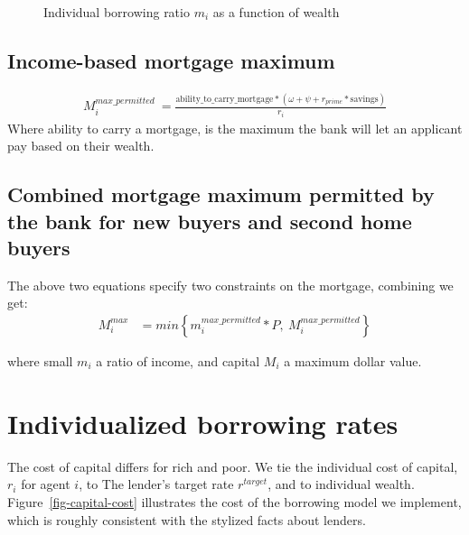 
\begin{figure}[htb]
\begin{center}

\end{center}
\caption{Individual borrowing ratio $m_i$ as a function of wealth}
\label{fig-individual-borrowing-rate}
\end{figure}


\subsection{Income-based mortgage maximum}

\begin{align}M^{max\_permitted}_i\ = \frac{\mathrm{ability\_to\_carry\_mortgage}*(\omega+\psi+ r_{prime}* \mathrm{savings})}{r_i}\end{align}\label{eqn-income-based-mortgage}
Where ability to carry a mortgage, is the maximum the bank will let an applicant pay based on their wealth.
 
\subsection{Combined mortgage maximum permitted by the bank for new buyers and second home buyers}

The above  two equations specify two constraints on the mortgage,  combining we get:
\begin{align} 
M_i^{max} &= min \left\{ m_i^{max\_permitted}*P, \ M^{max\_permitted}_i \right\} 
\label{eqn-max-mortgage-combined}
\end{align}

where small $m_i$ a ratio of income, and capital $M_i$ a maximum dollar value.




\section{Individualized borrowing rates} \label{section-borowing-rate}

The cost of capital differs for rich and poor. We tie the individual cost of capital,  $r_i$ for agent $i$, to The lender's target rate $r^{target}$, and to individual wealth. Figure~\ref{fig-capital-cost} illustrates the cost of the borrowing model we implement, which is  roughly consistent  with the stylized facts about lenders. 
 
